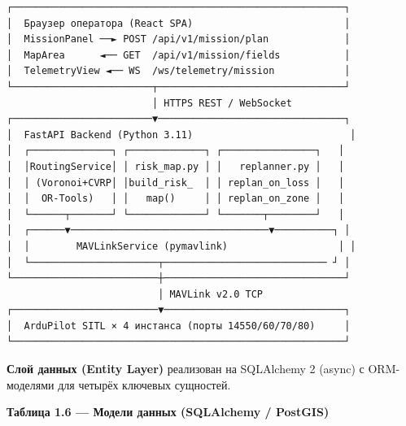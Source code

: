 \begin{verbatim}
┌─────────────────────────────────────────────────────────┐
│  Браузер оператора (React SPA)                          │
│  MissionPanel ──► POST /api/v1/mission/plan             │
│  MapArea      ◄── GET  /api/v1/mission/fields           │
│  TelemetryView ◄── WS  /ws/telemetry/mission            │
└────────────────────────┬────────────────────────────────┘
                         │ HTTPS REST / WebSocket
┌────────────────────────▼────────────────────────────────┐
│  FastAPI Backend (Python 3.11)                           │
│  ┌──────────────┐ ┌─────────────┐ ┌────────────────┐   │
│  │RoutingService│ │ risk_map.py │ │   replanner.py │   │
│  │ (Voronoi+CVRP│ │build_risk_  │ │ replan_on_loss │   │
│  │  OR-Tools)   │ │   map()     │ │ replan_on_zone │   │
│  └──────┬───────┘ └─────────────┘ └───────┬────────┘   │
│  ┌──────▼──────────────────────────────────▼──────────┐ │
│  │        MAVLinkService (pymavlink)                   │ │
│  └──────────────────────┬──────────────────────────── ┘ │
└─────────────────────────┼───────────────────────────────┘
                          │ MAVLink v2.0 TCP
┌─────────────────────────▼───────────────────────────────┐
│  ArduPilot SITL × 4 инстанса (порты 14550/60/70/80)     │
└─────────────────────────────────────────────────────────┘
\end{verbatim}

\textbf{Слой данных (Entity Layer)} реализован на SQLAlchemy 2 (async) с ORM-моделями для четырёх ключевых сущностей.

\textbf{Таблица 1.6 --- Модели данных (SQLAlchemy / PostGIS)}

